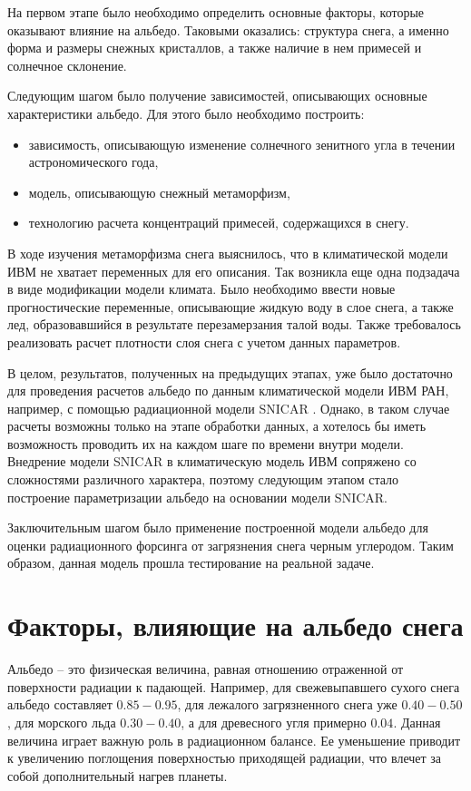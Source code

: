 \documentclass[a4paper, fontsize=14pt]{scrartcl}
\begin{document}
На первом этапе было необходимо определить основные факторы, которые оказывают влияние на альбедо. Таковыми оказались: структура снега, а именно форма и размеры снежных кристаллов, а также наличие в нем примесей и солнечное склонение.

Следующим шагом было получение зависимостей, описывающих основные характеристики альбедо. Для этого было необходимо построить:
\begin{itemize}
    \item зависимость, описывающую изменение солнечного зенитного угла в течении астрономического года,
    \item модель, описывающую снежный метаморфизм,  
    \item технологию расчета концентраций примесей, содержащихся в снегу.
\end{itemize} 

В ходе изучения метаморфизма снега выяснилось, что в климатической модели ИВМ не хватает переменных для его описания. Так возникла еще одна подзадача в виде модификации модели климата. Было необходимо ввести новые прогностические переменные, описывающие жидкую воду в слое снега, а также лед, образовавшийся в результате перезамерзания талой воды. Также требовалось реализовать расчет плотности слоя снега с учетом данных параметров.

В целом, результатов, полученных на предыдущих этапах, уже было достаточно для проведения расчетов альбедо по данным климатической модели ИВМ РАН, например, с помощью радиационной модели SNICAR \cite{Flanner2007}. Однако, в таком случае расчеты возможны только на этапе обработки данных, а хотелось бы иметь возможность проводить их на каждом шаге по времени внутри модели. Внедрение модели SNICAR в климатическую модель ИВМ сопряжено со сложностями различного характера, поэтому следующим этапом стало построение параметризации альбедо на основании модели SNICAR. 

Заключительным шагом было применение построенной модели альбедо для оценки радиационного форсинга от загрязнения снега черным углеродом. Таким образом, данная модель прошла тестирование на реальной задаче. 


\newpage
\section{Факторы, влияющие на альбедо снега}
Альбедо -- это физическая величина, равная отношению отраженной от поверхности радиации к падающей. Например, для свежевыпавшего сухого снега альбедо составляет $0.85-0.95$, для лежалого загрязненного снега уже $0.40-0.50$, для морского льда $0.30-0.40$, а для древесного угля примерно $0.04$. Данная величина играет важную роль в радиационном балансе. Ее уменьшение приводит к увеличению поглощения поверхностью приходящей радиации, что влечет за собой дополнительный нагрев планеты. 
\end{document}
